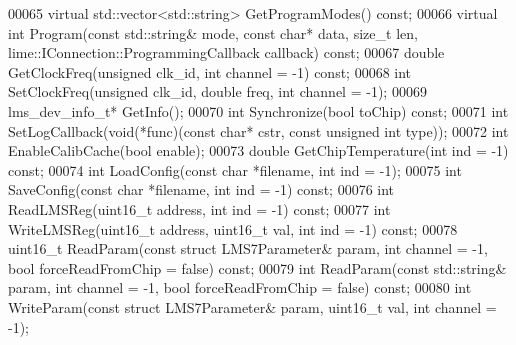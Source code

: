 \begin{DoxyCode}
00065     \textcolor{keyword}{virtual} std::vector<std::string> GetProgramModes() \textcolor{keyword}{const};
00066     \textcolor{keyword}{virtual} \textcolor{keywordtype}{int} Program(\textcolor{keyword}{const} std::string& mode, \textcolor{keyword}{const} \textcolor{keywordtype}{char}* data, \textcolor{keywordtype}{size\_t} len, 
      lime::IConnection::ProgrammingCallback callback) \textcolor{keyword}{const};
00067     \textcolor{keywordtype}{double} GetClockFreq(\textcolor{keywordtype}{unsigned} clk_id, \textcolor{keywordtype}{int} channel = -1) \textcolor{keyword}{const};
00068     \textcolor{keywordtype}{int} SetClockFreq(\textcolor{keywordtype}{unsigned} clk_id, \textcolor{keywordtype}{double} freq, \textcolor{keywordtype}{int} channel = -1);
00069     lms_dev_info_t* GetInfo();
00070     \textcolor{keywordtype}{int} Synchronize(\textcolor{keywordtype}{bool} toChip) \textcolor{keyword}{const};
00071     \textcolor{keywordtype}{int} SetLogCallback(\textcolor{keywordtype}{void}(*func)(\textcolor{keyword}{const} \textcolor{keywordtype}{char}* cstr, \textcolor{keyword}{const} \textcolor{keywordtype}{unsigned} \textcolor{keywordtype}{int} type));
00072     \textcolor{keywordtype}{int} EnableCalibCache(\textcolor{keywordtype}{bool} enable);
00073     \textcolor{keywordtype}{double} GetChipTemperature(\textcolor{keywordtype}{int} ind = -1) \textcolor{keyword}{const};
00074     \textcolor{keywordtype}{int} LoadConfig(\textcolor{keyword}{const} \textcolor{keywordtype}{char} *filename, \textcolor{keywordtype}{int} ind = -1);
00075     \textcolor{keywordtype}{int} SaveConfig(\textcolor{keyword}{const} \textcolor{keywordtype}{char} *filename, \textcolor{keywordtype}{int} ind = -1) \textcolor{keyword}{const};
00076     \textcolor{keywordtype}{int} ReadLMSReg(uint16\_t address, \textcolor{keywordtype}{int} ind = -1) \textcolor{keyword}{const};
00077     \textcolor{keywordtype}{int} WriteLMSReg(uint16\_t address, uint16\_t val, \textcolor{keywordtype}{int} ind = -1) \textcolor{keyword}{const};
00078     uint16\_t ReadParam(\textcolor{keyword}{const} \textcolor{keyword}{struct} LMS7Parameter& param, \textcolor{keywordtype}{int} channel = -1, \textcolor{keywordtype}{bool} forceReadFromChip = \textcolor{keyword}{false})
       \textcolor{keyword}{const};
00079     \textcolor{keywordtype}{int} ReadParam(\textcolor{keyword}{const} std::string& param, \textcolor{keywordtype}{int} channel = -1, \textcolor{keywordtype}{bool} forceReadFromChip = \textcolor{keyword}{false}) \textcolor{keyword}{const};
00080     \textcolor{keywordtype}{int} WriteParam(\textcolor{keyword}{const} \textcolor{keyword}{struct} LMS7Parameter& param, uint16\_t val, \textcolor{keywordtype}{int} channel = -1);

\end{DoxyCode}
